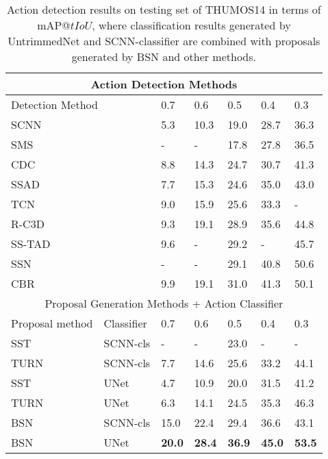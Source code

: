 \documentclass[runningheads]{llncs}
\begin{document}
\begin{table}[tbp]
\setlength{\abovecaptionskip}{0.1cm} %
\setlength{\belowcaptionskip}{-0.3cm} %
\centering
\caption{Action detection results on testing set of THUMOS14 in terms of mAP@$tIoU$, where classification results generated by UntrimmedNet \cite{wang2017untrimmednets} and  SCNN-classifier \cite{shou2016action} are combined with proposals generated by BSN and other  methods. }

\begin{tabular}{p{2.4cm}p{1.6cm}p{1.2cm}<{\centering}p{1.2cm}<{\centering}p{1.2cm}<{\centering}p{1.2cm}<{\centering}p{1.2cm}<{\centering}}
\toprule
\multicolumn{7}{c}{  Action Detection Methods }  \\
\hline
\multicolumn{2}{l}{  Detection Method } & 0.7 & 0.6 & 0.5 & 0.4 & 0.3  \\
\hline  
\multicolumn{2}{l}{  SCNN \cite{shou2016action} } & 5.3 & 10.3 &  19.0 & 28.7 & 36.3 \\
\multicolumn{2}{l}{  SMS \cite{yuan2017temporal} } & - & - & 17.8 &  27.8 &  36.5 \\
\multicolumn{2}{l}{  CDC \cite{shou2017cdc} } & 8.8 & 14.3 &  24.7 & 30.7 & 41.3  \\
\multicolumn{2}{l}{  SSAD \cite{ssad} } & 7.7 & 15.3 & 24.6 &  35.0 &  43.0 \\
\multicolumn{2}{l}{  TCN \cite{dai2017temporal} } & 9.0 & 15.9 & 25.6 &  33.3 &  - \\
\multicolumn{2}{l}{  R-C3D \cite{xu2017r} } & 9.3 & 19.1 &  28.9 & 35.6 & 44.8 \\
\multicolumn{2}{l}{  SS-TAD \cite{sstad} } & 9.6 & - &  29.2 & - & 45.7 \\
\multicolumn{2}{l}{  SSN  \cite{xiong2017pursuit} } & - & - & 29.1 & 40.8 & 50.6 \\
\multicolumn{2}{l}{  CBR \cite{gao2017cascaded} } & 9.9 & 19.1 &  31.0 & 41.3 & 50.1 \\
\hline 
\multicolumn{7}{c}{   Proposal Generation Methods + Action Classifier }  \\
\hline
Proposal method & Classifier & 0.7 & 0.6 & 0.5 & 0.4 & 0.3  \\
\hline
SST \cite{sst_buch_cvpr17} & SCNN-cls 	& - & - & 23.0 & - &  -\\
TURN \cite{gao2017turn} & SCNN-cls 		& 7.7 & 14.6 & 25.6 & 33.2 &  44.1\\
SST \cite{sst_buch_cvpr17} & UNet 		& 4.7 & 10.9 & 20.0 & 31.5 &  41.2\\
TURN \cite{gao2017turn} & UNet 			& 6.3 & 14.1 & 24.5 & 35.3 &  46.3\\
\hline
BSN & SCNN-cls & 15.0 & 22.4 & 29.4 & 36.6 &   43.1\\
BSN & UNet & {\bf 20.0} & {\bf 28.4} & {\bf 36.9} & {\bf 45.0} &  {\bf 53.5}\\
\bottomrule
\end{tabular}
\label{table_detection_thumos}
\normalsize
\end{table}
\end{document}
